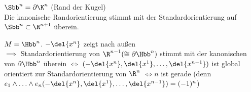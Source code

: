 \begin{rem*}
	\( \Sbb^n = \partial \K^n \) (Rand der Kugel)\\
	Die kanonische Randorientierung stimmt mit der Standardorientierung auf $\Sbb^n \subset \R^{n+1}$ überein.
\end{rem*}

\begin{exmp*}
	$M = \Hbb^n$. $-\del{x^n}$ zeigt nach außen\\
	\( \implies\) Standardorientierung von \( \R^{n-1} (\cong \partial \Hbb^n) \) stimmt mit der kanonischen von $\partial \Hbb^n$ überein $\iff$ \( (-\del{x^n},\del{x^1},\dotsc,\del{x^{n-1}}) \) ist global orientiert zur Standardorientierung von $\R^n$ $\iff n$ ist gerade \big(denn \( e_1 \wedge \dotsc \wedge e_n (-\del{x^n},\del{x^1},\dotsc,\del{x^{n-1}}) = (-1)^n \)\big)
\end{exmp*}